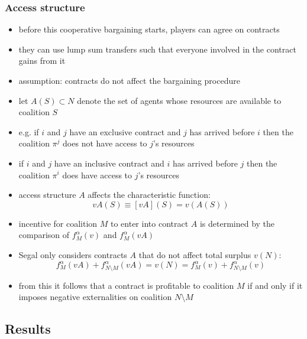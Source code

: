 \documentclass[11pt,english]{beamer}
\begin{document}
\begin{frame}[allowframebreaks]\frametitle{Access structure}
  \begin{itemize}
  \item before this cooperative bargaining starts, players can agree
    on contracts
  \item they can use lump sum transfers such that everyone involved in
    the contract gains from it
  \item assumption: contracts do not affect the bargaining procedure
  \item let $A(S) \subset N$ denote the set of agents whose resources
    are available to coalition $S$
  \item e.g. if $i$ and $j$ have an exclusive contract and $j$ has
    arrived before $i$ then the coalition $\pi^j$ does not have access
    to $j$'s resources
  \item if $i$ and $j$ have an inclusive contract and $i$ has
    arrived before $j$ then the coalition $\pi^i$ does have access
    to $j$'s resources
  \item access structure $A$ affects the characteristic function:
    \begin{equation}
      \label{eq:S03bVA}
      vA(S) \equiv [vA](S) = v(A(S))
    \end{equation}
  \item incentive for coalition $M$ to enter into contract $A$ is
    determined by the comparison of $f_M^{\alpha}(v)$ and $f_M^{\alpha}(vA)$
  \item Segal only considers contracts $A$ that do not affect
    total surplus $v(N)$:
    \begin{equation}
      \label{eq:S03bNoLossInSurplus}
      f_M^\alpha (vA) + f_{N\setminus M}^\alpha(vA) = v(N) = f_M^\alpha (v) + f_{N\setminus M}^\alpha(v)
    \end{equation}
  \item from this it follows that a contract is profitable to
    coalition $M$ if and only if it imposes negative externalities on
    coalition $N\setminus M$
  \end{itemize} %
\end{frame}

\subsection{Results}
\end{document}
